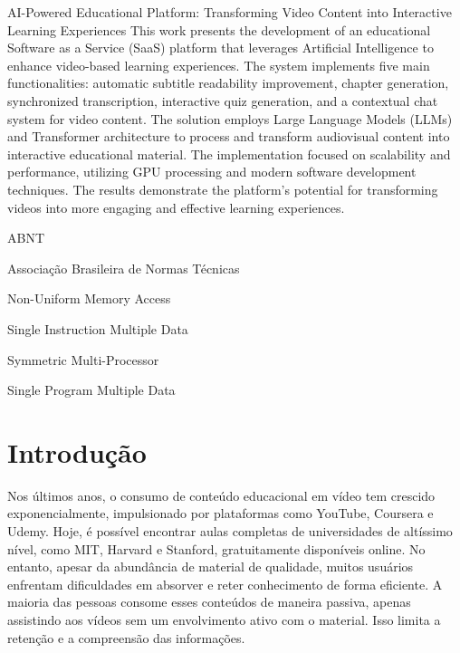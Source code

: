 \documentclass[tcc,capa]{texufpel}
\begin{document}
  \begin{englishabstract}{AI-Powered Educational Platform: Transforming Video Content into Interactive Learning Experiences}
  This work presents the development of an educational Software as a Service (SaaS) platform that leverages Artificial Intelligence to enhance video-based learning experiences. The system implements five main functionalities: automatic subtitle readability improvement, chapter generation, synchronized transcription, interactive quiz generation, and a contextual chat system for video content. The solution employs Large Language Models (LLMs) and Transformer architecture to process and transform audiovisual content into interactive educational material. The implementation focused on scalability and performance, utilizing GPU processing and modern software development techniques. The results demonstrate the platform's potential for transforming videos into more engaging and effective learning experiences.
  
  \end{englishabstract}

\listoffigures

\listoftables

\begin{listofabbrv}{ABNT}%
        \item[ABNT] Associação Brasileira de Normas Técnicas
        \item[NUMA] Non-Uniform Memory Access
        \item[SIMD] Single Instruction Multiple Data
        \item[SMP] Symmetric Multi-Processor
        \item[SPMD] Single Program Multiple Data
\end{listofabbrv}

\tableofcontents

\chapter{Introdução}
Nos últimos anos, o consumo de conteúdo educacional em vídeo tem crescido exponencialmente, impulsionado por plataformas como YouTube, Coursera e Udemy. Hoje, é possível encontrar aulas completas de universidades de altíssimo nível, como MIT, Harvard e Stanford, gratuitamente disponíveis online. No entanto, apesar da abundância de material de qualidade, muitos usuários enfrentam dificuldades em absorver e reter conhecimento de forma eficiente. A maioria das pessoas consome esses conteúdos de maneira passiva, apenas assistindo aos vídeos sem um envolvimento ativo com o material. Isso limita a retenção e a compreensão das informações.
\end{document}
